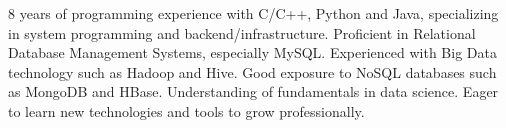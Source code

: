 

\begin{cvparagraph}

8 years of programming experience with C/C++, Python and
Java, specializing in system programming and
backend/infrastructure. Proficient in Relational Database Management
Systems, especially MySQL. Experienced with Big Data technology such
as Hadoop and Hive. Good exposure to NoSQL databases such as MongoDB
and HBase. Understanding of fundamentals in data science. Eager to
learn new technologies and tools to grow professionally.
\end{cvparagraph}
